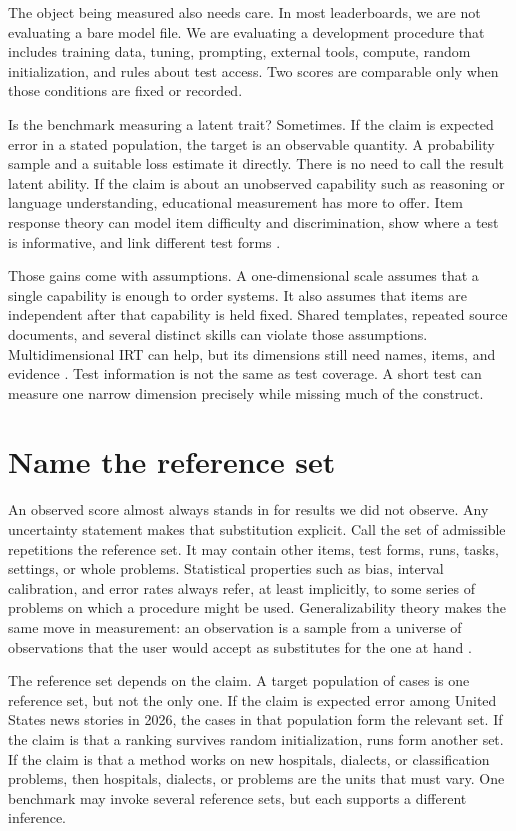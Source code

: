 \documentclass[11pt]{article}
\begin{document}
The object being measured also needs care. In most leaderboards, we are not evaluating a bare model file. We are evaluating a development procedure that includes training data, tuning, prompting, external tools, compute, random initialization, and rules about test access. Two scores are comparable only when those conditions are fixed or recorded.

Is the benchmark measuring a latent trait? Sometimes. If the claim is expected error in a stated population, the target is an observable quantity. A probability sample and a suitable loss estimate it directly. There is no need to call the result latent ability. If the claim is about an unobserved capability such as reasoning or language understanding, educational measurement has more to offer. Item response theory can model item difficulty and discrimination, show where a test is informative, and link different test forms \citep{vania2021irt,rodriguez2021leaderboards}.

Those gains come with assumptions. A one-dimensional scale assumes that a single capability is enough to order systems. It also assumes that items are independent after that capability is held fixed. Shared templates, repeated source documents, and several distinct skills can violate those assumptions. Multidimensional IRT can help, but its dimensions still need names, items, and evidence \citep{reckase2009mirt}. Test information is not the same as test coverage. A short test can measure one narrow dimension precisely while missing much of the construct.

\section*{Name the reference set}

An observed score almost always stands in for results we did not observe. Any uncertainty statement makes that substitution explicit. Call the set of admissible repetitions the reference set. It may contain other items, test forms, runs, tasks, settings, or whole problems. Statistical properties such as bias, interval calibration, and error rates always refer, at least implicitly, to some series of problems on which a procedure might be used. Generalizability theory makes the same move in measurement: an observation is a sample from a universe of observations that the user would accept as substitutes for the one at hand \citep{cronbach1972dependability,gelman2026workflow}.

The reference set depends on the claim. A target population of cases is one reference set, but not the only one. If the claim is expected error among United States news stories in 2026, the cases in that population form the relevant set. If the claim is that a ranking survives random initialization, runs form another set. If the claim is that a method works on new hospitals, dialects, or classification problems, then hospitals, dialects, or problems are the units that must vary. One benchmark may invoke several reference sets, but each supports a different inference.
\end{document}
